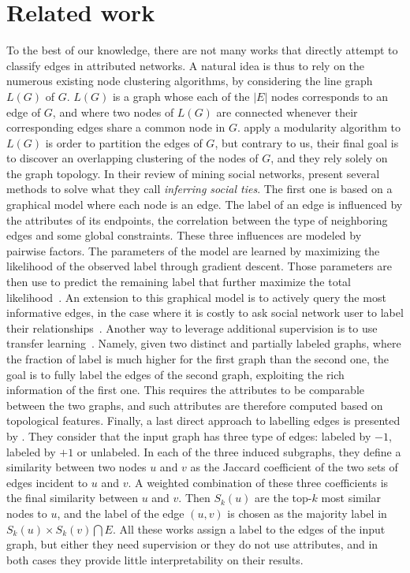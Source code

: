 \section{Related work}
\label{sec:edge_related}

To the best of our knowledge, there are not many works that directly attempt to classify edges in
attributed networks. A natural idea is thus to rely on the numerous existing node clustering
algorithms, by considering the line graph $L(G)$ of $G$. $L(G)$ is a graph whose each of the $|E|$
nodes corresponds to an edge of $G$, and where two nodes of $L(G)$ are connected whenever their
corresponding edges share a common node in $G$. \Textcite{LineGraph09} apply a modularity algorithm
to $L(G)$ is order to partition the edges of $G$, but contrary to us, their final goal is to
discover an overlapping clustering of the nodes of $G$, and they rely solely on the graph topology.
In their review of mining social networks, \textcite[Section 2.3]{SemanticMining15} present several
methods to solve what they call \emph{inferring social ties}. The first one is based on a graphical
model where each node is an edge. The label of an edge is influenced by the attributes of its
endpoints, the correlation between the type of neighboring edges and some global constraints. These
three influences are modeled by pairwise factors. The parameters of the model are learned by
maximizing the likelihood of the observed label through gradient descent. Those parameters are then
use to predict the remaining label that further maximize the total
likelihood~\autocite{graphicalModelTies11}. An extension to this graphical model is to actively
query the most informative edges, in the case where it is costly to ask social network user to label
their relationships~\autocite{Zhuang2012}. Another way to leverage additional supervision is to use
transfer learning~\autocite{transferTiesPred16}. Namely, given two distinct and partially labeled
graphs, where the fraction of label is much higher for the first graph than the second one, the goal
is to fully label the edges of the second graph, exploiting the rich information of the first one.
This requires the attributes to be comparable between the two graphs, and such attributes are
therefore computed based on topological features. Finally, a last direct approach to labelling edges
is presented by \textcite{Aggarwal2016a}. They consider that the input graph has three type of
edges: labeled by $-1$, labeled by $+1$ or unlabeled. In each of the three induced subgraphs, they
define a similarity between two nodes $u$ and $v$ as the Jaccard coefficient of the two sets of
edges incident to $u$ and $v$. A weighted combination of these three coefficients is the final
similarity between $u$ and $v$. Then $S_k(u)$ are the top-$k$ most similar nodes to $u$, and the
label of the edge $(u,v)$ is chosen as the majority label in $S_k(u)\times S_k(v) \bigcap E$.
All these works assign a label to the edges of the input graph, but either they need supervision or
they do not use attributes, and in both cases they provide little interpretability on their results.

